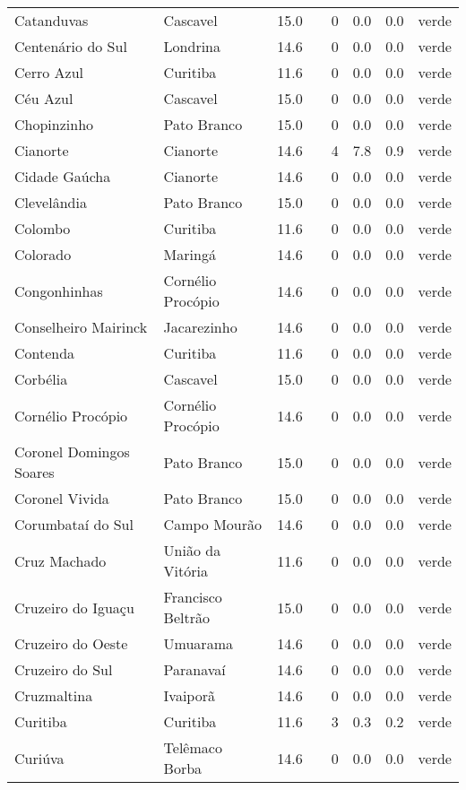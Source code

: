 \begin{longtable}{l|lllllll}
  Catanduvas & Cascavel & 15.0 &  & 0 & 0.0 & 0.0 & verde \\ 
  Centenário do Sul & Londrina & 14.6 &  & 0 & 0.0 & 0.0 & verde \\ 
  Cerro Azul & Curitiba & 11.6 &  & 0 & 0.0 & 0.0 & verde \\ 
  Céu Azul & Cascavel & 15.0 &  & 0 & 0.0 & 0.0 & verde \\ 
  Chopinzinho & Pato Branco & 15.0 &  & 0 & 0.0 & 0.0 & verde \\ 
  Cianorte & Cianorte & 14.6 &  & 4 & 7.8 & 0.9 & verde \\ 
  Cidade Gaúcha & Cianorte & 14.6 &  & 0 & 0.0 & 0.0 & verde \\ 
  Clevelândia & Pato Branco & 15.0 &  & 0 & 0.0 & 0.0 & verde \\ 
  Colombo & Curitiba & 11.6 &  & 0 & 0.0 & 0.0 & verde \\ 
  Colorado & Maringá & 14.6 &  & 0 & 0.0 & 0.0 & verde \\ 
  Congonhinhas & Cornélio Procópio & 14.6 &  & 0 & 0.0 & 0.0 & verde \\ 
  Conselheiro Mairinck & Jacarezinho & 14.6 &  & 0 & 0.0 & 0.0 & verde \\ 
  Contenda & Curitiba & 11.6 &  & 0 & 0.0 & 0.0 & verde \\ 
  Corbélia & Cascavel & 15.0 &  & 0 & 0.0 & 0.0 & verde \\ 
  Cornélio Procópio & Cornélio Procópio & 14.6 &  & 0 & 0.0 & 0.0 & verde \\ 
  Coronel Domingos Soares & Pato Branco & 15.0 &  & 0 & 0.0 & 0.0 & verde \\ 
  Coronel Vivida & Pato Branco & 15.0 &  & 0 & 0.0 & 0.0 & verde \\ 
  Corumbataí do Sul & Campo Mourão & 14.6 &  & 0 & 0.0 & 0.0 & verde \\ 
  Cruz Machado & União da Vitória & 11.6 &  & 0 & 0.0 & 0.0 & verde \\ 
  Cruzeiro do Iguaçu & Francisco Beltrão & 15.0 &  & 0 & 0.0 & 0.0 & verde \\ 
  Cruzeiro do Oeste & Umuarama & 14.6 &  & 0 & 0.0 & 0.0 & verde \\ 
  Cruzeiro do Sul & Paranavaí & 14.6 &  & 0 & 0.0 & 0.0 & verde \\ 
  Cruzmaltina & Ivaiporã & 14.6 &  & 0 & 0.0 & 0.0 & verde \\ 
  Curitiba & Curitiba & 11.6 &  & 3 & 0.3 & 0.2 & verde \\ 
  Curiúva & Telêmaco Borba & 14.6 &  & 0 & 0.0 & 0.0 & verde \\ 

\end{longtable}

